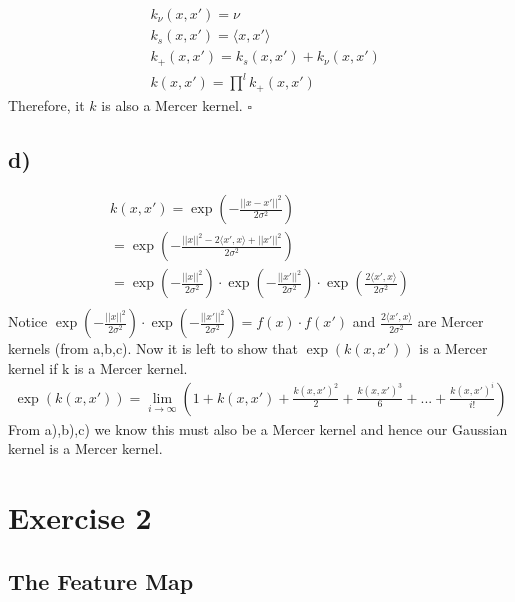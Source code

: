 \documentclass{article}
\begin{document}
\begin{align}
    & k_\nu(x, x') = \nu \\
    & k_s(x, x') = \langle{}x, x'\rangle{} \\
    & k_+(x, x') = k_s(x, x') + k_\nu(x, x') \\
    & k(x, x') = \prod^l k_+(x, x')
\end{align}
Therefore, it $k$ is also a Mercer kernel. \hfill $\square$ \\


\subsection*{d)}
\begin{gather*}
k(x,x') = \exp{}(- \frac{||x-x'||^2}{2\sigma^2}) \\
= \exp{}(-\frac{||x||^2 - 2\langle{}x',x\rangle{} + ||x'||^2}{2\sigma^2}) \\
= \exp{}(-\frac{||x||^2}{2\sigma^2}) \cdot \exp{}(-\frac{||x'||^2}{2\sigma^2}) \cdot \exp{}(\frac{2\langle{}x',x\rangle{}}{2\sigma^2}) \\ 
\end{gather*}
Notice $\exp{}(-\frac{||x||^2}{2\sigma^2}) \cdot \exp{}(-\frac{||x'||^2}{2\sigma^2}) = f(x)\cdot f(x')$ and $\frac{2\langle{}x',x\rangle{}}{2\sigma^2}$ are Mercer kernels (from a,b,c). Now it is left to show that $\exp{}(k(x,x'))$ is a Mercer kernel if k is a Mercer kernel.
\begin{gather*}
\exp{}(k(x,x')) = \lim\limits_{i \rightarrow \infty}{(1 + k(x,x') + \frac{k(x,x')^2}{2} + \frac{k(x,x')^3}{6} + ... + \frac{k(x,x')^i}{i!})}
\end{gather*}
From a),b),c) we know this must also be a Mercer kernel and hence our Gaussian kernel is a Mercer kernel. 



\section*{Exercise 2}

\subsection*{The Feature Map}
\end{document}
